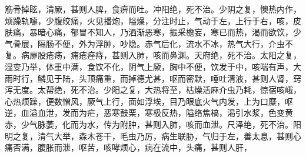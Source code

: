 \documentclass[a4paper,12pt,UTF8,twoside]{ctexbook}
\begin{document}
筋骨掉眩，清厥，甚则人脾，食痹而吐。冲阳绝，死不治。少阴之复，懊热内作，烦躁轨嚏，少腹绞痛，火见播炮，隘燥，分注时止，气动于左，上行于右，咳，皮肤痛，暴暗心痛，郁冒不知人，乃洒渐恶寒，振采檐妄，寒已而热，渴而欲饮，少气骨展，隔肠不便，外为浮肿，吵隐。赤气后化，流水不冰，热气大行，介虫不复。病扉股疮疡，痈疮痤痔，甚则入肺，咳而鼻渊。天府绝，死不治。太阳之复，湿变乃举，体重中满，食饮不化，阴气上厥，胸中不便，饮发于中，咳喘有声，大雨时行，鳞见于陆，头顶痛重，而掉德尤甚，呕而密默，唾吐清液，甚则人肾，窍泻无度。太帮绝，死不治。少阳之复，大热将至，枯燥活麻介虫乃耗，惊宿咳峨，心热烦躁，便数憎风，厥气上行，面如浮埃，目乃眼底火气内发，上为口糜，呕逆，血溢血泄，发而为疟，恶寒鼓栗，寒极反热，隘络焦槁，渴引水浆，色变黄赤，少气脉萎，化而为水，传为附肿，甚则入肺，咳而血泄。尺泽绝，死不治。阳明之复，清气大举，森木苍干，毛虫乃厉，病生联胁，气归于左，善太息，甚则心痛否满，腹胀而泄，呕苦，咳哮烦心，病在流中，头痛，甚则人肝，
\end{document}
